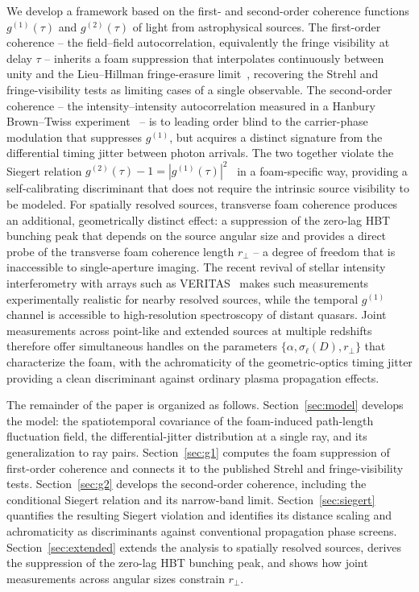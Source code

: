We develop a framework based on the first- and second-order coherence
functions $g^{(1)}(\tau)$ and $g^{(2)}(\tau)$ of light from astrophysical
sources.
The first-order coherence -- the field--field autocorrelation, equivalently
the fringe visibility at delay $\tau$ -- inherits a foam suppression that
interpolates continuously between unity and the Lieu--Hillman fringe-erasure
limit~\cite{LieuHillman2003}, recovering the Strehl and fringe-visibility
tests as limiting cases of a single observable.
The second-order coherence -- the intensity--intensity autocorrelation
measured in a Hanbury Brown--Twiss experiment~\cite{HBT1956} -- is to leading
order blind to the carrier-phase modulation that suppresses $g^{(1)}$, but
acquires a distinct signature from the differential timing jitter between
photon arrivals.
The two together violate the Siegert relation
$g^{(2)}(\tau) - 1 = |g^{(1)}(\tau)|^2$~\cite{Siegert1943} in a foam-specific
way, providing a self-calibrating discriminant that does not require the
intrinsic source visibility to be modeled.
For spatially resolved sources, transverse foam coherence produces an
additional, geometrically distinct effect: a suppression of the zero-lag
HBT bunching peak that depends on the source angular size and provides a direct
probe of the transverse foam coherence length $r_\perp$ -- a degree of freedom
that is inaccessible to single-aperture imaging.
The recent revival of stellar intensity interferometry with arrays such as
VERITAS~\cite{Abeysekara2020,Acharyya2024} makes such measurements
experimentally realistic for nearby resolved sources, while the temporal
$g^{(1)}$ channel is accessible to high-resolution spectroscopy of distant
quasars.
Joint measurements across point-like and extended sources at multiple
redshifts therefore offer simultaneous handles on the parameters
$\{\alpha,\sigma_\ell(D),r_\perp\}$ that characterize the foam, with the
achromaticity of the geometric-optics timing jitter providing a clean
discriminant against ordinary plasma propagation effects.

The remainder of the paper is organized as follows.
Section~\ref{sec:model} develops the model: the spatiotemporal covariance of
the foam-induced path-length fluctuation field, the differential-jitter
distribution at a single ray, and its generalization to ray pairs.
Section~\ref{sec:g1} computes the foam suppression of first-order coherence
and connects it to the published Strehl and fringe-visibility tests.
Section~\ref{sec:g2} develops the second-order coherence, including the
conditional Siegert relation and its narrow-band limit.
Section~\ref{sec:siegert} quantifies the resulting Siegert violation and
identifies its distance scaling and achromaticity as discriminants against
conventional propagation phase screens.
Section~\ref{sec:extended} extends the analysis to spatially resolved sources,
derives the suppression of the zero-lag HBT bunching peak, and shows how
joint measurements across angular sizes constrain $r_\perp$.
